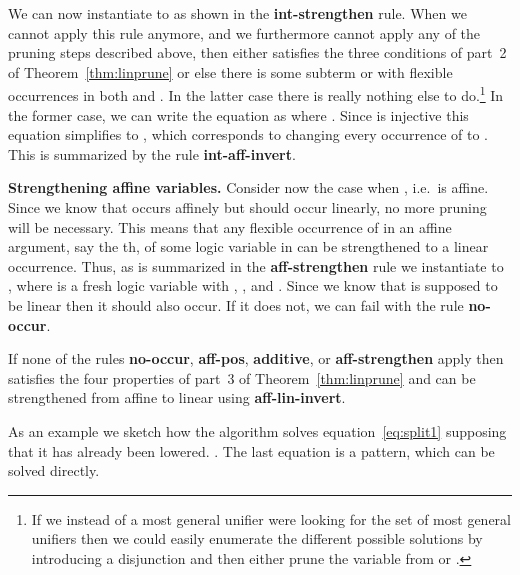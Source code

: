 \documentclass{eptcs}
\theoremstyle{definition}
\begin{document}
We can now instantiate  to  as shown in the
\textbf{int-strengthen} rule.
When we cannot apply this rule anymore, and we furthermore cannot apply
any of the pruning steps described above, then either  satisfies the
three conditions of part~2 of Theorem~\ref{thm:linprune} or else there
is some subterm  or  with flexible
occurrences in both  and .  In the latter case there is really
nothing else to do.\footnote{If we instead of a most general unifier
  were looking for the set of most general unifiers then we could
  easily enumerate the different possible solutions by introducing a
  disjunction and then either prune the variable from  or .}
In the former case, we can write the equation  as
 where
.  Since  is injective this equation
simplifies to , which corresponds to changing
every occurrence of  to .  This is
summarized by the rule \textbf{int-aff-invert}.


\medskip \noindent\textbf{Strengthening affine variables.}
Consider now the case when , i.e.\  is affine.  Since we
know that  occurs affinely but should occur linearly,
no more pruning will be necessary.  This means that any
flexible occurrence of  in an affine argument,
say the th, of some logic variable  in  can be strengthened to
a linear occurrence.  Thus, as is summarized in the
\textbf{aff-strengthen} rule we instantiate  to , where  is
a fresh logic variable with ,
, and
.
Since we know that  is supposed to be linear then it should also occur.
If it does not, we can fail with the rule \textbf{no-occur}.

If none of the rules \textbf{no-occur}, \textbf{aff-pos},
\textbf{additive}, or \textbf{aff-strengthen} apply then 
satisfies the four properties of part~3 of Theorem~\ref{thm:linprune}
and can be strengthened from affine to linear using
\textbf{aff-lin-invert}.

\bigskip

As an example we sketch how the algorithm solves
equation~\eqref{eq:split1} supposing that it has already been lowered.
.  The
last equation is a pattern, which can be solved directly.
\end{document}
